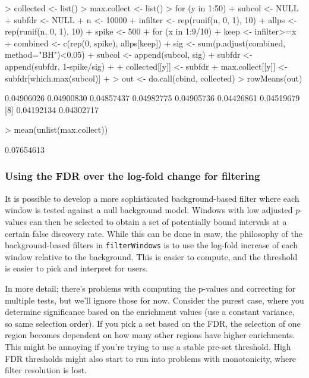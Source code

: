 \documentclass[12pt]{report}
\renewenvironment{Schunk}{\vspace{0pt}}{\vspace{0pt}}
\newcommand{\pkgname}{csaw}
\newcommand{\code}[1]{{\small\texttt{#1}}}
\begin{document}
\begin{Schunk}
\begin{Sinput}
> collected <- list()
> max.collect <- list()
> for (y in 1:50) {
+ 	subcol <- NULL
+ 	subfdr <- NULL
+ 	n <- 10000
+ 	infilter <- rep(runif(n, 0, 1), 10)
+ 	allps <- rep(runif(n, 0, 1), 10)
+ 	spike <- 500
+ 	for (x in 1:9/10) {
+ 		keep <- infilter>=x
+ 		combined <- c(rep(0, spike), allps[keep])
+ 		sig <- sum(p.adjust(combined, method="BH")<0.05)
+ 		subcol <- append(subcol, sig)
+ 		subfdr <- append(subfdr, 1-spike/sig)
+ 	}
+ 	collected[[y]] <- subfdr
+ 	max.collect[[y]] <- subfdr[which.max(subcol)]
+ }
> out <- do.call(cbind, collected)
> rowMeans(out)
\end{Sinput}
\begin{Soutput}
[1] 0.04906026 0.04900830 0.04857437 0.04982775 0.04905736 0.04426861 0.04519679
[8] 0.04192134 0.04302717
\end{Soutput}
\begin{Sinput}
> mean(unlist(max.collect))
\end{Sinput}
\begin{Soutput}
[1] 0.07654613
\end{Soutput}
\end{Schunk}

\subsubsection*{Using the FDR over the log-fold change for filtering} 

It is possible to develop a more sophisticated background-based filter where each window is tested against a null background model.
Windows with low adjusted $p$-values can then be selected to obtain a set of potentially bound intervals at a certain false discovery rate.
While this can be done in \pkgname{}, the philosophy of the background-based filters in \code{filterWindows} is to use the log-fold increase of each window relative to the background.
This is easier to compute, and the threshold is easier to pick and interpret for users.

In more detail; there's problems with computing the p-values and correcting for multiple tests, but we'll ignore those for now.
Consider the purest case, where you determine significance based on the enrichment values (use a constant variance, so same selection order).
If you pick a set based on the FDR, the selection of one region becomes dependent on how many other regions have higher enrichments.
This might be annoying if you're trying to use a stable pre-set threshold.
High FDR thresholds might also start to run into problems with monotonicity, where filter resolution is lost.
\end{document}

